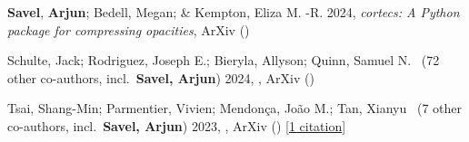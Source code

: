 \item[{\color{numcolor}\scriptsize3}] \textbf{Savel}, \textbf{Arjun}; Bedell, Megan; \& Kempton, Eliza M. -R. 2024, \emph{cortecs: A Python package for compressing opacities}, ArXiv ()

\item[{\color{numcolor}\scriptsize2}] Schulte, Jack; Rodriguez, Joseph E.; Bieryla, Allyson; Quinn, Samuel N. \etal\ ({72} other co-authors, incl.\ \textbf{Savel, Arjun}) 2024, , ArXiv ()

\item[{\color{numcolor}\scriptsize1}] Tsai, Shang-Min; Parmentier, Vivien; Mendon{\c{c}}a, Jo{\~a}o M.; Tan, Xianyu \etal\ ({7} other co-authors, incl.\ \textbf{Savel, Arjun}) 2023, , ArXiv () [\href{https://ui.adsabs.harvard.edu/abs/2023arXiv231017751T}{1 citation}]